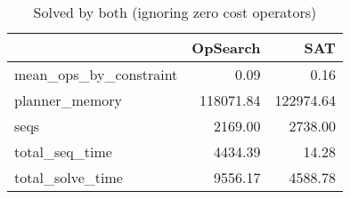 \begin{table}[htbp]
\centering
\begingroup\small
\begin{tabular}{lrr}
  \hline
 & OpSearch & SAT \\ 
  \hline
mean\_ops\_by\_constraint & 0.09 & 0.16 \\ 
  planner\_memory & 118071.84 & 122974.64 \\ 
  seqs & 2169.00 & 2738.00 \\ 
  total\_seq\_time & 4434.39 & 14.28 \\ 
  total\_solve\_time & 9556.17 & 4588.78 \\ 
   \hline
\end{tabular}
\endgroup
\caption{Solved by both (ignoring zero cost operators)} 
\label{tab:summary_both}
\end{table}
